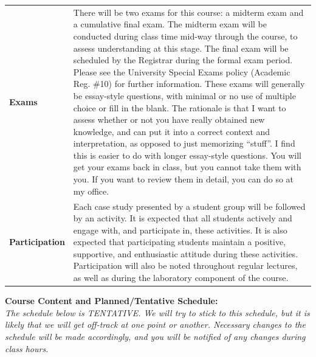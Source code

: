 \documentclass[hidelinks]{article}
\begin{document}
\begin{table}[H]
\begin{tabular}{@{} >{\raggedright}p{2.5cm} p{13.7cm}}
				\addlinespace
				\textbf{Exams} & There will be two exams for this course: a midterm exam and a cumulative final exam. The midterm exam will be conducted during class time mid-way through the course, to assess understanding at this stage. The final exam will be scheduled by the Registrar during the formal exam period. Please see the University Special Exams policy (Academic Reg. \#10) for further information. These exams will generally be essay-style questions, with minimal or no use of multiple choice or fill in the blank. The rationale is that I want to assess whether or not you have really obtained new knowledge, and can put it into a correct context and interpretation, as opposed to just memorizing ``stuff''. I find this is easier to do with longer essay-style questions. You will get your exams back in class, but you cannot take them with you. If you want to review them in detail, you can do so at my office.\\
				\addlinespace
				\textbf{Participation} & Each case study presented by a student group will be followed by an activity. It is expected that all students actively and engage with, and participate in, these activities. It is also expected that participating students maintain a positive, supportive, and enthusiastic attitude during these activities. Participation will also be noted throughout regular lectures, as well as during the laboratory component of the course.
			\end{tabular}
		\end{table}	

			
\newpage		
\textbf{Course Content and Planned/Tentative Schedule:}\\
\emph{The schedule below is TENTATIVE. We will try to stick to this schedule, but it is likely that we will get off-track at one point or another. Necessary changes to the schedule will be made accordingly, and you will be notified of any changes during class hours.}	
\end{document}
